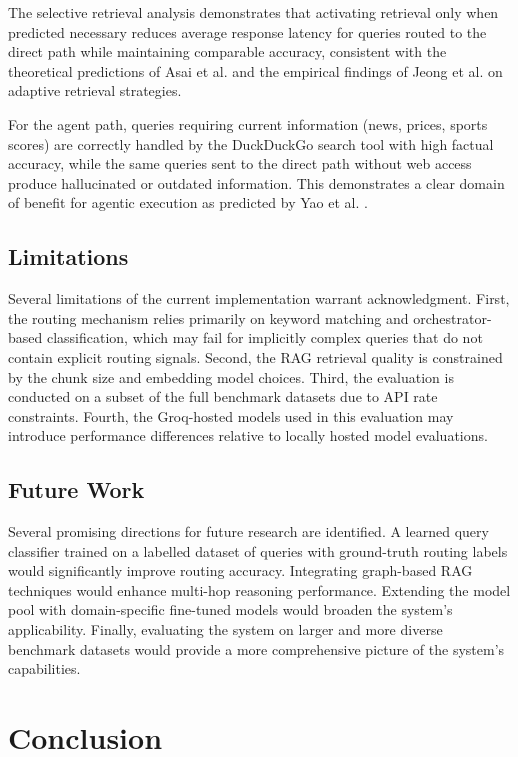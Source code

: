 \documentclass[12pt,a4paper]{article}
\begin{document}
The selective retrieval analysis demonstrates that activating retrieval only when predicted necessary reduces average response latency for queries routed to the direct path while maintaining comparable accuracy, consistent with the theoretical predictions of Asai et al. \cite{asai2023self} and the empirical findings of Jeong et al. \cite{jeong2024adaptive} on adaptive retrieval strategies.

For the agent path, queries requiring current information (news, prices, sports scores) are correctly handled by the DuckDuckGo search tool with high factual accuracy, while the same queries sent to the direct path without web access produce hallucinated or outdated information. This demonstrates a clear domain of benefit for agentic execution as predicted by Yao et al. \cite{yao2023react}.

\subsection{Limitations}

Several limitations of the current implementation warrant acknowledgment. First, the routing mechanism relies primarily on keyword matching and orchestrator-based classification, which may fail for implicitly complex queries that do not contain explicit routing signals. Second, the RAG retrieval quality is constrained by the chunk size and embedding model choices. Third, the evaluation is conducted on a subset of the full benchmark datasets due to API rate constraints. Fourth, the Groq-hosted models used in this evaluation may introduce performance differences relative to locally hosted model evaluations.

\subsection{Future Work}

Several promising directions for future research are identified. A learned query classifier trained on a labelled dataset of queries with ground-truth routing labels would significantly improve routing accuracy. Integrating graph-based RAG techniques would enhance multi-hop reasoning performance. Extending the model pool with domain-specific fine-tuned models would broaden the system's applicability. Finally, evaluating the system on larger and more diverse benchmark datasets would provide a more comprehensive picture of the system's capabilities.

\section{Conclusion}
\end{document}
